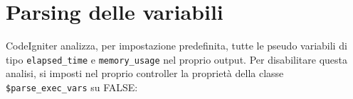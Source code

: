 \section*{Parsing delle variabili}
CodeIgniter analizza, per impostazione predefinita, tutte le pseudo variabili di tipo \verb|elapsed_time| e \verb|memory_usage| nel proprio output. Per disabilitare questa analisi, si imposti nel proprio controller la proprietà della classe \verb|$parse_exec_vars| su FALSE:

